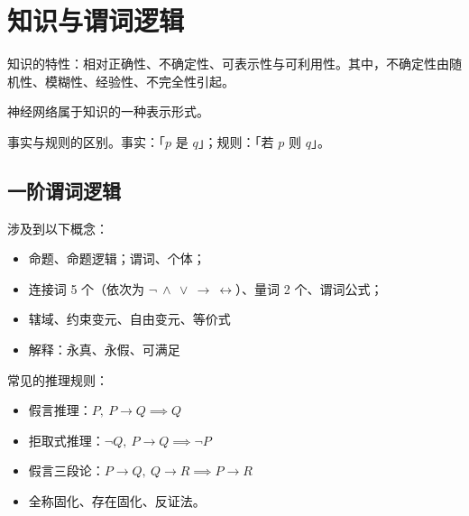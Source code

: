 \documentclass[UTF8]{ctexart}
\newcommand\Emph[1]{\colorbox{green!10}{\textcolor{green!30!black}{#1}}}
\begin{document}
\section{知识与谓词逻辑}
知识的特性：相对正确性、不确定性、可表示性与可利用性。其中，不确定性由随机性、模糊性、经验性、不完全性引起。

\Emph{神经网络}属于知识的一种表示形式。

事实与规则的区别。事实：「$p$ 是 $q$」；规则：「若 $p$ 则 $q$」。

\subsection{一阶谓词逻辑}
涉及到以下概念：
\begin{itemize}[itemsep=0pt,parsep=0pt]
  \item 命题、命题逻辑；谓词、个体；
  \item 连接词 5 个（依次为 $\neg\ \wedge\ \vee\ \to\ \leftrightarrow$）、量词 2 个、谓词公式；
  \item 辖域、约束变元、自由变元、等价式
  \item 解释：永真、永假、可满足
\end{itemize}

常见的推理规则：
\begin{itemize}[itemsep=0pt,parsep=0pt]
  \item 假言推理：$P,\ P\to Q \implies Q$
  \item 拒取式推理：$\neg Q, \ P\to Q \implies \neg P$
  \item 假言三段论：$P\to Q,\ Q\to R \implies P\to R$
  \item 全称固化、存在固化、反证法。
\end{itemize}

\BgThispage
\end{document}
